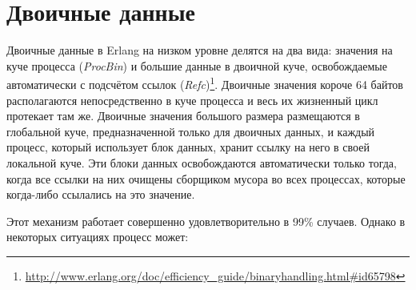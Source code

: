 \documentclass[11pt, oneside]{book}   	%
\begin{document}
\section{Двоичные данные}
\label{sec:binaries}

Двоичные данные в Erlang на низком уровне делятся на два вида: значения на куче процесса (\emph{ProcBin}) и большие данные в двоичной куче, освобождаемые автоматически с подсчётом ссылок (\emph{Refc})\footnote{\href{http://www.erlang.org/doc/efficiency\_guide/binaryhandling.html\#id65798}{http://www.erlang.org/doc/efficiency\_guide/binaryhandling.html\#id65798}}. Двоичные значения короче 64 байтов располагаются непосредственно в куче процесса и весь их жизненный цикл протекает там же. Двоичные значения большого размера размещаются в глобальной куче, предназначенной только для двоичных данных, и каждый процесс, который использует блок данных, хранит ссылку на него в своей локальной куче. Эти блоки данных освобождаются автоматически только тогда, когда все ссылки на них очищены сборщиком мусора во всех процессах, которые когда-либо ссылались на это значение.

Этот механизм работает совершенно удовлетворительно в 99\% случаев. Однако в некоторых ситуациях процесс может:
\end{document}
